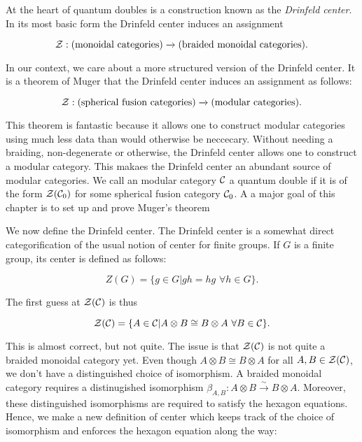 At the heart of quantum doubles is a construction known as the {\em Drinfeld center}. In its most basic form the Drinfeld center induces an assignment

$${\mathcal Z}: (\text{monoidal categories})\xrightarrow{}(\text{braided monoidal categories}).$$

In our context, we care about a more structured version of the Drinfeld center. It is a theorem of Muger that the Drinfeld center induces an assignment as follows:

$${\mathcal Z}: (\text{spherical fusion categories})\xrightarrow{}(\text{modular categories}).$$

This theorem is fantastic because it allows one to construct modular categories using much less data than would otherwise be neccecary. Without needing a braiding, non-degenerate or otherwise, the Drinfeld center allows one to construct a modular category. This makaes the Drinfeld center an abundant source of modular categories. We call an modular category ${\mathcal C}$ a quantum double if it is of the form ${\mathcal Z}({\mathcal C}_0)$ for some spherical fusion category ${\mathcal C}_0$. A a major goal of this chapter is to set up and prove Muger's theorem

We now define the Drinfeld center. The Drinfeld center is a somewhat direct categorification of the usual notion of center for finite groups. If $G$ is a finite group, its center is defined as follows:

$$Z(G)=\{g\in G | gh=hg \,\, \forall h\in G\}.$$

The first guess at ${\mathcal Z}({\mathcal C})$ is thus

$${\mathcal Z}({\mathcal C})=\{A\in {\mathcal C} | A\otimes B \cong B\otimes A \,\, \forall B\in {\mathcal C}\}.$$

This is almost correct, but not quite. The issue is that ${\mathcal Z}({\mathcal C})$ is not quite a braided monoidal category yet. Even though $A\otimes B\cong B\otimes A$ for all $A,B\in {\mathcal Z}({\mathcal C})$, we don't have a distinguished choice of isomorphism. A braided monoidal category requires a distinugished isomorphism $\beta_{A,B}:A\otimes B\xrightarrow{\sim} B\otimes A$. Moreover, these distinguished isomorphisms are required to satisfy the hexagon equations. Hence, we make a new definition of center which keeps track of the choice of isomorphism and enforces the hexagon equation along the way:


